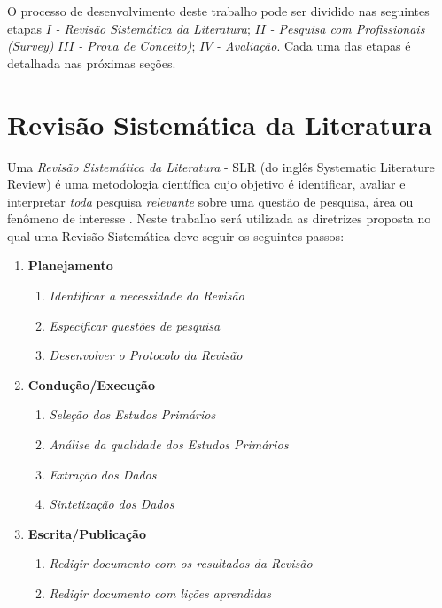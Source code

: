 \documentclass[msc,proposal,hidelot,hideabstract]{ppgccufmg} %
\begin{document}
O processo de desenvolvimento deste trabalho pode ser dividido nas seguintes
etapas $I$\textit{ - Revisão Sistemática da Literatura}; $II$\textit{ - Pesquisa
  com Profissionais (Survey)} $III$\textit{ - Prova de Conceito)}; $IV$\textit{ - Avaliação}. Cada uma das etapas é detalhada nas próximas seções.

\section{Revisão Sistemática da Literatura}
\label{sec:revisao_sistematica}

Uma \textit{Revisão Sistemática da Literatura} - SLR (do inglês Systematic Literature Review) é uma
metodologia científica cujo objetivo é identificar, avaliar e interpretar
\textit{toda} pesquisa \textit{relevante} sobre uma questão de pesquisa, área
ou fenômeno de interesse \cite{keele2007guidelines,wohlin2012experimentation}. Neste trabalho
será utilizada as diretrizes proposta \cite{keele2007guidelines} no qual uma
Revisão Sistemática deve seguir os seguintes passos:

\begin{enumerate}
  \item \textbf{Planejamento}
  \begin{enumerate}
    \item \textit{Identificar a necessidade da Revisão}
    \item \textit{Especificar questões de pesquisa}
    \item \textit{Desenvolver o Protocolo da Revisão}
  \end{enumerate}
  \item \textbf{Condução/Execução}
  \begin{enumerate}
    \item \textit{Seleção dos Estudos Primários}
    \item \textit{Análise da qualidade dos Estudos Primários}
     \item \textit{Extração dos Dados}
     \item \textit{Sintetização dos Dados}
   \end{enumerate}
  \item \textbf{Escrita/Publicação}
  \begin{enumerate}
    \item \textit{Redigir documento com os resultados da Revisão}
    \item \textit{Redigir documento com lições aprendidas}
  \end{enumerate}
\end{enumerate}
\end{document}
